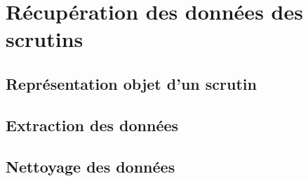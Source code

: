 \section{Récupération des données des scrutins}

\subsection{Représentation objet d'un scrutin}

\subsection{Extraction des données}

\subsection{Nettoyage des données}
